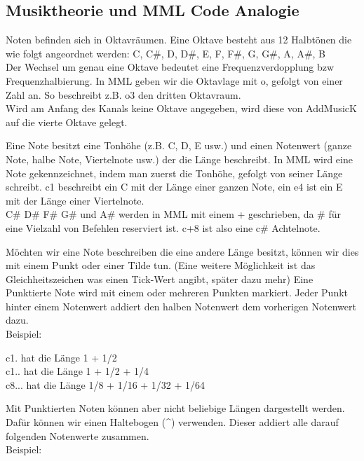 \subsection{Musiktheorie und MML Code Analogie}

Noten befinden sich in Oktavräumen. Eine Oktave besteht aus 12 Halbtönen die wie folgt angeordnet werden:
C, C\#, D, D\#, E, F, F\#, G, G\#, A, A\#, B \\
Der Wechsel um genau eine Oktave bedeutet eine Frequenzverdopplung bzw Frequenzhalbierung.
In MML geben wir die Oktavlage mit o, gefolgt von einer Zahl an.
So beschreibt z.B. o3 den dritten Oktavraum. \\

Wird am Anfang des Kanals keine Oktave angegeben, wird diese von AddMusicK auf die vierte Oktave gelegt.

\bigskip

Eine Note besitzt eine Tonhöhe (z.B. C, D, E usw.) und einen Notenwert (ganze Note, halbe Note, Viertelnote usw.) der die Länge beschreibt.
In MML wird eine Note gekennzeichnet, indem man zuerst die Tonhöhe, gefolgt von seiner Länge schreibt.
c1 beschreibt ein C mit der Länge einer ganzen Note, ein e4 ist ein E mit der Länge einer Viertelnote. \\
C\# D\# F\# G\# und A\# werden in MML mit einem + geschrieben, da \# für eine Vielzahl von Befehlen reserviert ist. c+8 ist also eine c\# Achtelnote.

\bigskip

Möchten wir eine Note beschreiben die eine andere Länge besitzt, können wir dies mit einem Punkt oder einer Tilde tun. (Eine weitere Möglichkeit ist das Gleichheitszeichen was einen Tick-Wert angibt, später dazu mehr) Eine Punktierte Note wird mit einem oder mehreren Punkten markiert. Jeder Punkt hinter einem Notenwert addiert den halben Notenwert dem vorherigen Notenwert dazu. \\
Beispiel:

\bigskip

c1. hat die Länge 1 + 1/2 \\
c1.. hat die Länge 1 + 1/2 + 1/4 \\
c8... hat die Länge 1/8 + 1/16 + 1/32 + 1/64

\bigskip

Mit Punktierten Noten können aber nicht beliebige Längen dargestellt werden.
Dafür können wir einen Haltebogen (\textasciicircum) verwenden. Dieser addiert alle darauf folgenden Notenwerte zusammen. \\
Beispiel:

